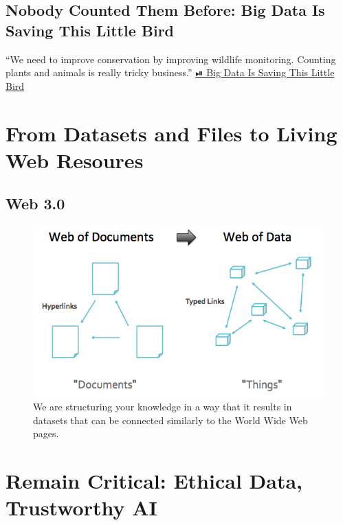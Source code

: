 \documentclass[
  letterpaper,
  DIV=11,
  numbers=noendperiod]{scrreprt}
\begin{document}
\subsection{Nobody Counted Them Before: Big Data Is Saving This Little
Bird}\label{nobody-counted-them-before-big-data-is-saving-this-little-bird}

``We need to improve conservation by improving wildlife monitoring.
Counting plants and animals is really tricky business.''
\href{https://fivethirtyeight.com/features/big-data-is-saving-this-little-bird/}{⏯
Big Data Is Saving This Little Bird}

\section{From Datasets and Files to Living Web
Resoures}\label{sec-web-30}

\subsection{Web 3.0}\label{web-3.0}

\begin{figure}[H]

{\centering \includegraphics{png/inspiration/weblinks.png}

}

\caption{We are structuring your knowledge in a way that it results in
datasets that can be connected similarly to the World Wide Web pages.}

\end{figure}%

\section{Remain Critical: Ethical Data, Trustworthy
AI}\label{critical-attitude}
\end{document}

